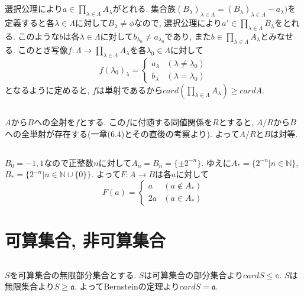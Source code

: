 \documentclass{jsarticle}
\begin{document}
\subsection{} %
選択公理により$a \in \prod_{\lambda \in \Lambda}A_\lambda$がとれる. 集合族$(B_\lambda)_{\lambda \in \Lambda} = (B_\lambda)_{\lambda \in \Lambda} - {a_\lambda})$を定義すると各$\lambda \in \Lambda$に対して$B_\lambda \neq \phi$なので, 選択公理により$a' \in \prod_{\lambda \in \Lambda}B_\lambda$をとれる. このような$b$は各$\lambda \in \Lambda$に対して$b_{\lambda_0} \neq a_{\lambda_0}$であり, また$b \in \prod_{\lambda \in \Lambda}A_\lambda$とみなせる. このとき写像$f: \Lambda \rightarrow \prod_{\lambda \in \Lambda}A_\lambda$を各$\lambda_0 \in \Lambda$に対して
\begin{equation*}
	f(\lambda_0)_\lambda = 
	\begin{cases}
		a_\lambda & (\lambda \neq \lambda_0)\\
		b_\lambda & (\lambda = \lambda_0)
	\end{cases}
\end{equation*}
となるように定めると, $f$は単射であるから$card (\prod_{\lambda \in \Lambda}A_\lambda) \geq card A$.

\subsection{} %
$A$から$B$への全射を$f$とする. この$f$に付随する同値関係を$R$とすると, $A / R$から$B$への全単射が存在する(一章(6.4)とその直後の考察より). よって$A / R$と$B$は対等.

\subsection{} %
$B_0 = {-1, 1}$なので正整数$n$に対して$A_n = B_n = \{\pm 2^{-n}\}$. ゆえに$A_* = \{2^{-n}| n \in \mathbb{N}\}$, $B_* = \{2^{-n}| n \in \mathbb{N} \cup \{0\}\}$. よって$F: A \rightarrow B$は各$a$に対して
\begin{equation*}
	F(a) =
	\begin{cases}
		a & (a \notin A_*)\\
		2a & (a \in A_*)
	\end{cases}
\end{equation*}


\section{可算集合, 非可算集合} %
\subsection{} %
$S$を可算集合の無限部分集合とする. $S$は可算集合の部分集合より$card S \leq \mathbb{a}$. $S$は無限集合より$S \geq \mathfrak{a}$. よってBernsteinの定理より$card S = \mathfrak{a}$.
\end{document}
